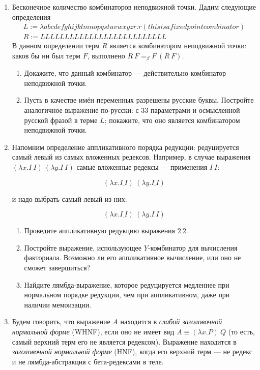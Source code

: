 \documentclass[10pt,a4paper,oneside]{article}
\begin{document}
\begin{enumerate}
\item Бесконечное количество комбинаторов неподвижной точки. Дадим следующие определения
$$\begin{array}{l}
L := \lambda abcdefghijklmnopqstuvwxyzr.r(thisisafixedpointcombinator)\\
R := LLLLLLLLLLLLLLLLLLLLLLLLLL\end{array}$$
В данном определении терм $R$ является комбинатором неподвижной точки: каков бы ни был терм
$F$, выполнено $R\ F =_\beta F\ (R\ F)$.
\begin{enumerate}
\item Докажите, что данный комбинатор --- действительно комбинатор неподвижной точки.
\item Пусть в качестве имён переменных разрешены русские буквы. Постройте аналогичное выражение
по-русски: с 33 параметрами и осмысленной русской фразой в терме $L$; покажите, что оно является
комбинатором неподвижной точки.
\end{enumerate}

\item Напомним определение аппликативного порядка редукции:
редуцируется самый левый из самых вложенных редексов. Например, в случае выражения
$(\lambda x.I\ I)\ (\lambda y.I\ I)$ самые вложенные редексы --- применения $I\ I$:

$$(\lambda x.\underline{I\ I})\ (\lambda y.\underline{I\ I})$$

и надо выбрать самый левый из них:

$$(\lambda x.\underline{I\ I})\ (\lambda y.I\ I)$$
\begin{enumerate}
\item Проведите аппликативную редукцию выражения $2\ 2$.
\item Постройте выражение, использующее $Y$-комбинатор для вычисления факториала. 
Возможно ли его аппликативное вычисление, или оно не сможет завершиться?
\item Найдите лямбда-выражение, которое редуцируется медленнее при нормальном порядке редукции,
чем при аппликативном, даже при наличии мемоизации.
\end{enumerate}

\item Будем говорить, что выражение $A$ находится в \emph{слабой заголовочной нормальной форме} (WHNF),
если оно не имеет вид $A \equiv (\lambda x.P)\ Q$ (то есть, самый верхний терм его не является редексом).
Выражение находится в \emph{заголовочной нормальной форме} (HNF), когда его верхний терм --- не редекс и не лямбда-абстракция
с бета-редексами в теле.


\end{enumerate}
\end{document}

